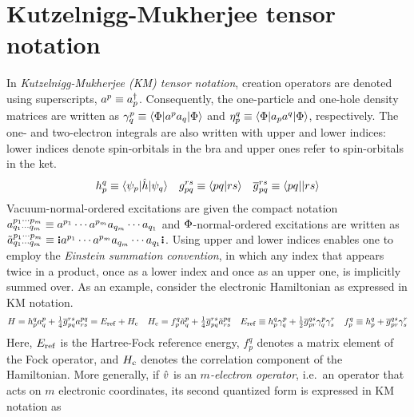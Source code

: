 \documentclass[11pt]{article}
\numberwithin{equation}{section}
\begin{document}
\setlength{\abovedisplayskip}{3pt}
\setlength{\belowdisplayskip}{3pt}

\setcounter{section}{2}
\section{Kutzelnigg-Mukherjee tensor notation}

\begin{ntt}\label{ntt:kutzelnigg-mukherjee-notation}
In \textit{Kutzelnigg-Mukherjee (KM) tensor notation}, creation operators are denoted using superscripts, $a^p\equiv a_p^\dagger$.
Consequently, the one-particle and one-hole density matrices are written as
$
  \gamma ^p_q
\equiv
  \langle\Phi |a^pa_q|\Phi \rangle
$
and
$
  \eta _p^q
\equiv
  \langle\Phi |a_p a^q|\Phi \rangle
$,
respectively.
The one- and two-electron integrals are also written with upper and lower indices: lower indices denote spin-orbitals in the bra and upper ones refer to spin-orbitals in the ket.
\begin{align}
  h_p^q
\equiv
  \langle\psi _p|\hat{h}|\psi _q\rangle
&&
  g_{pq}^{rs}
\equiv
  \langle pq|rs\rangle
&&
  \overline{g}_{pq}^{rs}
\equiv
  \langle pq||rs\rangle
\end{align}
Vacuum-normal-ordered excitations are given the compact notation
$
  a^{p_1\cdots p_m}_{q_1\cdots q_m}
\equiv
  a^{p_1}\cdots a^{p_m}a_{q_m}\cdots a_{q_1}
$
and $\Phi $-normal-ordered excitations are written as
$
  \tl{a}^{p_1\cd p_m}_{q_1\cd q_m}
\equiv
  \gno{a^{p_1}\cd a^{p_m}a_{q_m}\cd a_{q_1}}
$.
Using upper and lower indices enables one to employ the \textit{Einstein summation convention}, in which any index that appears twice in a product, once as a lower index and once as an upper one, is implicitly summed over.
As an example, consider the electronic Hamiltonian as expressed in KM notation.
\begin{align}
  H
=
  h_p^q
  a^p_q
+
  \tfrac{1}{4}
  \overline{g}_{pq}^{rs}
  a^{pq}_{rs}
=
  E_{\mathrm{ref}}
+
  H_{\mathrm{c}}
&&
  H_{\mathrm{c}}
=
  f_p^q
  \tilde{a}^p_q
+
  \tfrac{1}{4}
  \overline{g}_{pq}^{rs}
  \tilde{a}^{pq}_{rs}
&&
  E_{\mathrm{ref}}
\equiv
  h_p^q
  \gamma ^p_q
+
  \tfrac{1}{2}
  \overline{g}_{pr}^{qs}
  \gamma ^p_q
  \gamma ^r_s
&&
  f_p^q
\equiv
  h_p^q
+
  \overline{g}_{pr}^{qs}
  \gamma _s^r
\end{align}
Here, $E_{\mathrm{ref}}$ is the Hartree-Fock reference energy, $f_p^q$ denotes a matrix element of the Fock operator, and $H_{\mathrm{c}}$ denotes the correlation component of the Hamiltonian.
More generally, if $\hat{v}$ is an \textit{$m$-electron operator}, i.e.\ an operator that acts on $m$ electronic coordinates, its second quantized form is expressed in KM notation as

\end{ntt}
\end{document}
